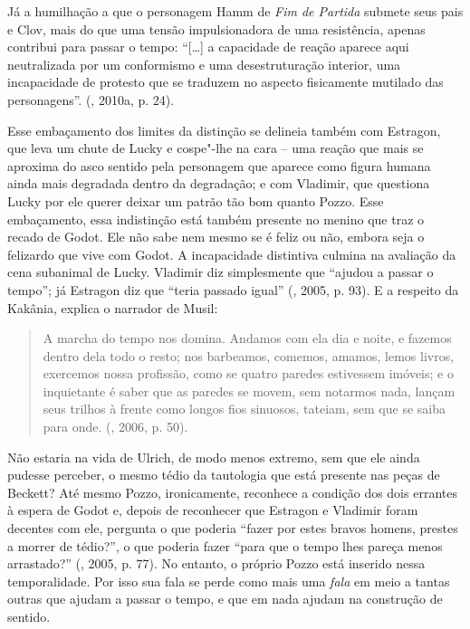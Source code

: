 Já a humilhação a que o personagem Hamm de \emph{Fim de Partida} submete
seus pais e Clov, mais do que uma tensão impulsionadora de uma
resistência, apenas contribui para passar o tempo: ``[\ldots{}] a
capacidade de reação aparece aqui neutralizada por um conformismo e uma
desestruturação interior, uma incapacidade de protesto que se traduzem
no aspecto fisicamente mutilado das personagens''. (, 2010a, p.
24).

Esse embaçamento dos limites da distinção se delineia também com
Estragon, que leva um chute de Lucky e cospe"-lhe na cara -- uma reação
que mais se aproxima do asco sentido pela personagem que aparece como
figura humana ainda mais degradada dentro da degradação; e com Vladimir,
que questiona Lucky por ele querer deixar um patrão tão bom quanto
Pozzo. Esse embaçamento, essa indistinção está também presente no menino
que traz o recado de Godot. Ele não sabe nem mesmo se é feliz ou não,
embora seja o felizardo que vive com Godot. A incapacidade distintiva
culmina na avaliação da cena subanimal de Lucky. Vladimir diz
simplesmente que ``ajudou a passar o tempo''; já Estragon diz que
``teria passado igual'' (, 2005, p. 93). E a respeito da Kakânia,
explica o narrador de Musil:

\begin{quote}
A marcha do tempo nos domina. Andamos com ela dia e noite, e fazemos
dentro dela todo o resto; nos barbeamos, comemos, amamos, lemos livros,
exercemos nossa profissão, como se quatro paredes estivessem imóveis; e
o inquietante é saber que as paredes se movem, sem notarmos nada, lançam
seus trilhos à frente como longos fios sinuosos, tateiam, sem que se
saiba para onde. (, 2006, p. 50).
\end{quote}

Não estaria na vida de Ulrich, de modo menos extremo, sem que ele ainda
pudesse perceber, o mesmo tédio da tautologia que está presente nas
peças de Beckett? Até mesmo Pozzo, ironicamente, reconhece a condição
dos dois errantes à espera de Godot e, depois de reconhecer que Estragon
e Vladimir foram decentes com ele, pergunta o que poderia ``fazer por
estes bravos homens, prestes a morrer de tédio?'', o que poderia fazer
``para que o tempo lhes pareça menos arrastado?'' (, 2005, p.
77). No entanto, o próprio Pozzo está inserido nessa temporalidade. Por
isso sua fala se perde como mais uma \emph{fala} em meio a tantas outras
que ajudam a passar o tempo, e que em nada ajudam na construção de
sentido.

